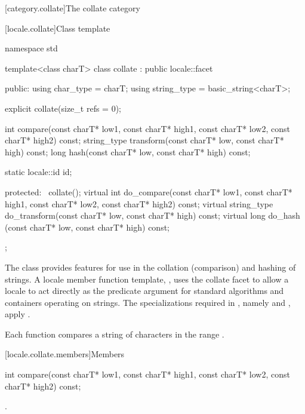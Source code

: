 [category.collate]{The collate category}

[locale.collate]{Class template }

%
\begin{codeblock}
namespace std {
  template<class charT>
    class collate : public locale::facet {
    public:
      using char_type   = charT;
      using string_type = basic_string<charT>;

      explicit collate(size_t refs = 0);

      int compare(const charT* low1, const charT* high1,
                  const charT* low2, const charT* high2) const;
      string_type transform(const charT* low, const charT* high) const;
      long hash(const charT* low, const charT* high) const;

      static locale::id id;

    protected:
      ~collate();
      virtual int do_compare(const charT* low1, const charT* high1,
                             const charT* low2, const charT* high2) const;
      virtual string_type do_transform(const charT* low, const charT* high) const;
      virtual long do_hash (const charT* low, const charT* high) const;
    };
}
\end{codeblock}

\pnum
The class
provides features for use in the
collation (comparison) and hashing of strings.
A locale member function template,
,
uses the collate facet to allow a locale to act directly as the predicate
argument for standard algorithms and containers operating on strings.
The specializations required in , namely
and
,
apply .

\pnum
Each function compares a string of characters
in the range
.

[locale.collate.members]{Members}

%
\begin{itemdecl}
int compare(const charT* low1, const charT* high1,
            const charT* low2, const charT* high2) const;
\end{itemdecl}

\begin{itemdescr}
\pnum
\returns
{}.
\end{itemdescr}


